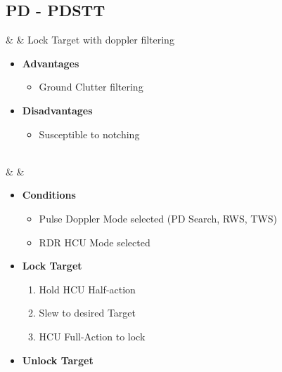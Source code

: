 \documentclass[fontInter]{TechCheck}
\begin{document}
	\clearpage

	\subsection{PD - PDSTT}
	\begin{center}
	\end{center}
	\begin{listlongtable}
		\textbf{\textbullet} &  & Lock Target with doppler filtering \thumbnar
		\begin{minipage}[t]{\linewidth}
			\vspace{-7pt}
			\begin{itemize}
				\item \textbf{Advantages}
				\begin{itemize}
					\item Ground Clutter filtering
				\end{itemize}
				\item \textbf{Disadvantages}
				\begin{itemize}
					\item Susceptible to notching
				\end{itemize}
			\end{itemize}
		\end{minipage} \\
		\midrule
		\textbf{\textbullet} &  &
		\begin{minipage}[t]{\linewidth}
			\vspace{-7pt}
			\begin{itemize}
				\item \textbf{Conditions}
				\begin{itemize}
					\item Pulse Doppler Mode selected (PD Search, RWS, TWS)
					\item RDR HCU Mode selected
				\end{itemize}
				\item \textbf{Lock Target}
				\begin{enumerate}
					\item Hold HCU Half-action
					\item Slew to desired Target
					\item HCU Full-Action to lock
				\end{enumerate}
				\item \textbf{Unlock Target}
				\begin{enumerate}[label=(\alph*), resume]

\end{enumerate}
\end{itemize}
\end{minipage}
\end{listlongtable}
\end{document}
